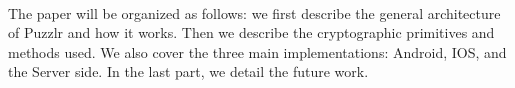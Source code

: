     \paragraph{}
    The paper will be organized as follows: we first describe the general architecture of Puzzlr and how it works. Then we describe the cryptographic primitives and methods used. We also cover the three main implementations: Android, IOS, and the Server side. In the last part, we detail the future work.